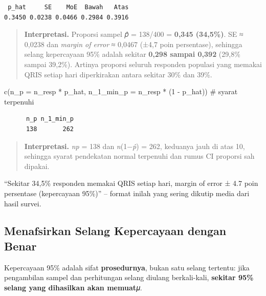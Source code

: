 \documentclass[
  indonesian,
  letterpaper,
]{book}
\newenvironment{Shaded}{\begin{snugshade}}{\end{snugshade}}
\newcommand{\AttributeTok}[1]{\textcolor[rgb]{0.40,0.45,0.13}{#1}}
\newcommand{\CommentTok}[1]{\textcolor[rgb]{0.37,0.37,0.37}{#1}}
\newcommand{\DecValTok}[1]{\textcolor[rgb]{0.68,0.00,0.00}{#1}}
\newcommand{\FunctionTok}[1]{\textcolor[rgb]{0.28,0.35,0.67}{#1}}
\newcommand{\NormalTok}[1]{\textcolor[rgb]{0.00,0.23,0.31}{#1}}
\newcommand{\SpecialCharTok}[1]{\textcolor[rgb]{0.37,0.37,0.37}{#1}}
\begin{document}
\begin{verbatim}
 p_hat     SE    MoE  Bawah   Atas 
0.3450 0.0238 0.0466 0.2984 0.3916 
\end{verbatim}

\begin{quote}
\textbf{Interpretasi.} Proporsi sampel 𝑝̂ = 138/400 = \textbf{0,345
(34,5\%)}. SE ≈ 0,0238 dan \emph{margin of error} ≈ 0,0467 (±4,7 poin
persentase), sehingga selang kepercayaan 95\% adalah sekitar
\textbf{0,298 sampai 0,392} (29,8\% sampai 39,2\%). Artinya proporsi
seluruh responden populasi yang memakai QRIS setiap hari diperkirakan
antara sekitar 30\% dan 39\%.
\end{quote}

\begin{Shaded}
\begin{Highlighting}[]
\FunctionTok{c}\NormalTok{(}\AttributeTok{n\_p =}\NormalTok{ n\_resp }\SpecialCharTok{*}\NormalTok{ p\_hat, }\AttributeTok{n\_1\_min\_p =}\NormalTok{ n\_resp }\SpecialCharTok{*}\NormalTok{ (}\DecValTok{1} \SpecialCharTok{{-}}\NormalTok{ p\_hat)) }\CommentTok{\# syarat terpenuhi}
\end{Highlighting}
\end{Shaded}

\begin{verbatim}
      n_p n_1_min_p 
      138       262 
\end{verbatim}

\begin{quote}
\textbf{Interpretasi.} \emph{np} = 138 dan \emph{n}(1−\emph{p̂}) = 262,
keduanya jauh di atas 10, sehingga syarat pendekatan normal terpenuhi
dan rumus CI proporsi sah dipakai.
\end{quote}

``Sekitar 34,5\% responden memakai QRIS setiap hari, margin of error ±
4.7 poin persentase (kepercayaan 95\%)'' -- format inilah yang sering
dikutip media dari hasil survei.

\subsection{Menafsirkan Selang Kepercayaan dengan
Benar}\label{menafsirkan-selang-kepercayaan-dengan-benar}

Kepercayaan 95\% adalah sifat \textbf{prosedurnya}, bukan satu selang
tertentu: jika pengambilan sampel dan perhitungan selang diulang
berkali-kali, \textbf{sekitar 95\% selang yang dihasilkan akan memuat}𝜇.
\end{document}
